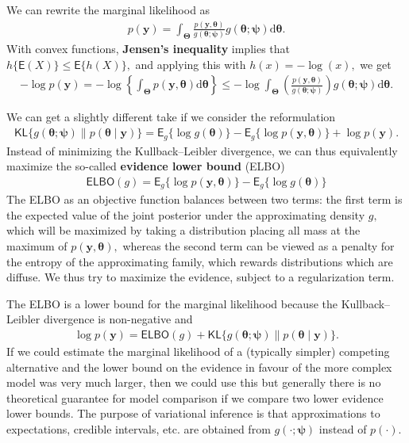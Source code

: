 \documentclass[
  11pt,
  letterpaper,
]{scrbook}
\theoremstyle{definition}
\theoremstyle{plain}
\theoremstyle{plain}
\theoremstyle{plain}
\theoremstyle{definition}
\theoremstyle{definition}
\theoremstyle{plain}
\theoremstyle{plain}
\theoremstyle{remark}
\begin{document}
We can rewrite the marginal likelihood as \begin{align*}
p(\boldsymbol{y}) = \int_{\boldsymbol{\Theta}}  \frac{p(\boldsymbol{y}, \boldsymbol{\theta})}{g(\boldsymbol{\theta};\boldsymbol{\psi})} g(\boldsymbol{\theta};\boldsymbol{\psi}) \mathrm{d} \boldsymbol{\theta}.
\end{align*} With convex functions, \textbf{Jensen's inequality} implies
that \(h\{\mathsf{E}(X)\} \leq \mathsf{E}\{h(X)\},\) and applying this
with \(h(x)=-\log(x),\) we get \begin{align*}
-\log p(\boldsymbol{y})  = -\log \left\{\int_{\boldsymbol{\Theta}} p(\boldsymbol{y}, \boldsymbol{\theta}) \mathrm{d} \boldsymbol{\theta}\right\} \leq - \log  \int_{\boldsymbol{\Theta}} \left(\frac{p(\boldsymbol{y}, \boldsymbol{\theta})}{g(\boldsymbol{\theta};\boldsymbol{\psi})}\right) g(\boldsymbol{\theta};\boldsymbol{\psi}) \mathrm{d} \boldsymbol{\theta}.
\end{align*}

We can get a slightly different take if we consider the reformulation
\begin{align*}
\mathsf{KL}\{g(\boldsymbol{\theta};\boldsymbol{\psi}) \parallel p(\boldsymbol{\theta} \mid \boldsymbol{y})\} = \mathsf{E}_{g}\{\log g(\boldsymbol{\theta})\} - \mathsf{E}_g\{\log p(\boldsymbol{y}, \boldsymbol{\theta})\} + \log p(\boldsymbol{y}).
\end{align*} Instead of minimizing the Kullback--Leibler divergence, we
can thus equivalently maximize the so-called \textbf{evidence lower
bound} (ELBO) \begin{align*}
\mathsf{ELBO}(g) = \mathsf{E}_g\{\log p(\boldsymbol{y}, \boldsymbol{\theta})\} - \mathsf{E}_{g}\{\log g(\boldsymbol{\theta})\}
\end{align*} The ELBO as an objective function balances between two
terms: the first term is the expected value of the joint posterior under
the approximating density \(g,\) which will be maximized by taking a
distribution placing all mass at the maximum of
\(p(\boldsymbol{y}, \boldsymbol{\theta}),\) whereas the second term can
be viewed as a penalty for the entropy of the approximating family,
which rewards distributions which are diffuse. We thus try to maximize
the evidence, subject to a regularization term.

The ELBO is a lower bound for the marginal likelihood because the
Kullback--Leibler divergence is non-negative and \begin{align*}
\log p(\boldsymbol{y}) = \mathsf{ELBO}(g) +  \mathsf{KL}\{g(\boldsymbol{\theta};\boldsymbol{\psi}) \parallel p(\boldsymbol{\theta} \mid \boldsymbol{y})\}.
\end{align*} If we could estimate the marginal likelihood of a
(typically simpler) competing alternative and the lower bound on the
evidence in favour of the more complex model was very much larger, then
we could use this but generally there is no theoretical guarantee for
model comparison if we compare two lower evidence lower bounds. The
purpose of variational inference is that approximations to expectations,
credible intervals, etc. are obtained from
\(g(\cdot; \boldsymbol{\psi})\) instead of \(p(\cdot).\)
\end{document}
